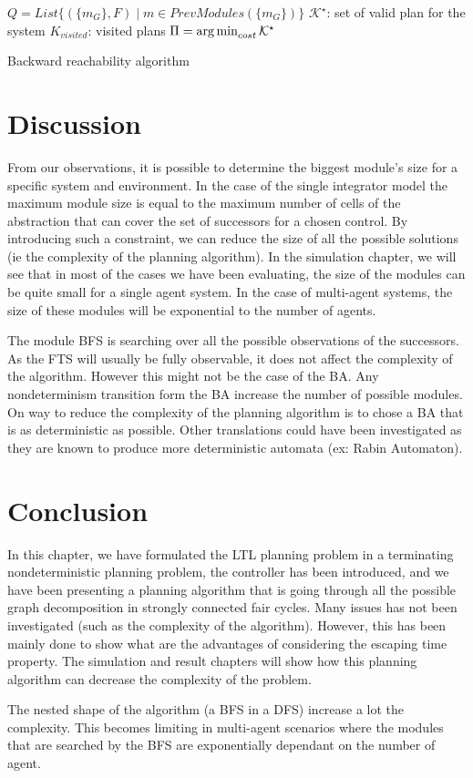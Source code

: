 \begin{algorithm}
\SetAlgoNoLine
{}
\KwResult{$\Fsc$}
 $Q = List\{ (\{m_G\},F) \mid m \in PrevModules(\{m_G\}) \}$\; 
 $\mathcal{K}^\star$: set of valid plan for the system\;  
 $K_{visited}$: visited plans\;
 $\Pi = \operatorname*{arg\,min}_{cost}{\mathcal{K}^\star}$\;
 \caption{Backward reachability algorithm}
 \label{algo}
\end{algorithm}

\section{Discussion}
From our observations, it is possible to determine the biggest module's size for a specific system and environment.
In the case of the single integrator model the maximum module size is equal to the maximum number of cells of the abstraction that can cover the set of successors for a chosen control.
By introducing such a constraint, we can reduce the size of all the possible solutions (ie the complexity of the planning algorithm).
In the simulation chapter, we will see that in most of the cases we have been evaluating, the size of the modules can be quite small for a single agent system.
In the case of multi-agent systems, the size of these modules will be exponential to the number of agents.

The module BFS is searching over all the possible observations of the successors.
As the FTS will usually be fully observable, it does not affect the complexity of the algorithm. However this might not be the case of the BA. Any nondeterminism transition form the BA increase the number of possible modules.
On way to reduce the complexity of the planning algorithm is to chose a BA that is as deterministic as possible.
Other translations could have been investigated as they are known to produce more deterministic automata (ex: Rabin Automaton).

\section{Conclusion}
In this chapter, we have formulated the LTL planning problem in a terminating nondeterministic planning problem, the controller has been introduced, and we have been presenting a planning algorithm that is going through all the possible graph decomposition in strongly connected fair cycles.
Many issues has not been investigated (such as the complexity of the algorithm). However, this has been mainly done to show what are the advantages of considering the escaping time property.
The simulation and result chapters will show how this planning algorithm can decrease the complexity of the problem.

The nested shape of the algorithm (a BFS in a DFS) increase a lot the complexity. This becomes limiting in multi-agent scenarios where the modules that are searched by the BFS are exponentially dependant on the number of agent.